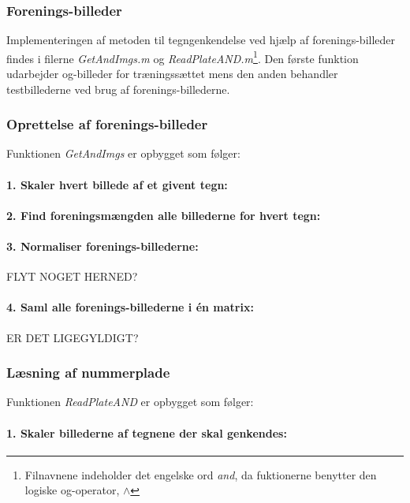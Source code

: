 \subsubsection{Forenings-billeder}

Implementeringen af metoden til tegngenkendelse ved hjælp af forenings-billeder findes i filerne \textit{GetAndImgs.m} og \textit{ReadPlateAND.m}\footnote{Filnavnene indeholder det engelske ord \textit{and}, da fuktionerne benytter den logiske og-operator, $\wedge$}. Den første funktion udarbejder og-billeder for træningssættet mens den anden behandler testbillederne ved brug af forenings-billederne.

\subsubsection*{Oprettelse af forenings-billeder}

Funktionen \textit{GetAndImgs} er opbygget som følger:

\paragraph{1. Skaler hvert billede af et givent tegn:}

\paragraph{2. Find foreningsmængden alle billederne for hvert tegn:}

\paragraph{3. Normaliser forenings-billederne:} FLYT NOGET HERNED?

\paragraph{4. Saml alle forenings-billederne i én matrix:} ER DET LIGEGYLDIGT?

\subsubsection*{Læsning af nummerplade}

Funktionen \textit{ReadPlateAND} er opbygget som følger:

\paragraph{1. Skaler billederne af tegnene der skal genkendes:}

